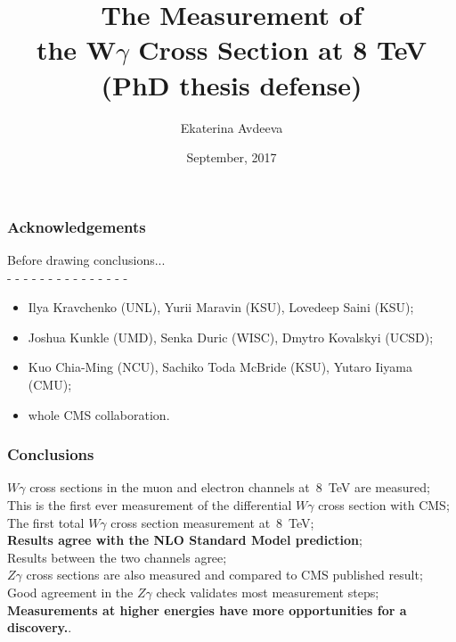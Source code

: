 \documentclass{beamer}
\title{The Measurement of \\ the W$\gamma$ Cross Section at 8 TeV \\ (PhD thesis defense) }
\author{Ekaterina Avdeeva}
\institute{University of Nebraska - Lincoln}
\date{September, 2017}
\begin{document}
\begin{frame}
\titlepage %
\end{frame}


\begin{frame}\frametitle{Acknowledgements}
  \scriptsize
  Before drawing conclusions...\\
  - - - - - - - - - - - - - - - \\
  \begin{itemize}
     \item Ilya Kravchenko (UNL), Yurii Maravin (KSU), Lovedeep Saini (KSU);
     \item Joshua Kunkle (UMD), Senka Duric (WISC), Dmytro Kovalskyi (UCSD);
     \item Kuo Chia-Ming (NCU), Sachiko Toda McBride (KSU), Yutaro Iiyama (CMU);
     \item whole CMS collaboration.
  \end{itemize}
\end{frame}%
 

\begin{frame}\frametitle{Conclusions} %
  \scriptsize
     \vspace{5mm}
     $W\gamma$ cross sections in the muon and electron channels at~8~TeV are measured; \\
     \vspace{5mm}
     This is the first ever measurement of the differential $W\gamma$ cross section with CMS;\\
     The first total $W\gamma$ cross section measurement at~8~TeV;\\
     \vspace{5mm}    
     {\bfseries{Results agree with the NLO Standard Model prediction}};\\
     Results between the two channels agree;\\
     \vspace{5mm}
     $Z\gamma$ cross sections are also measured and compared to CMS published result;\\
     Good agreement in the $Z\gamma$ check validates most measurement steps;\\
     \vspace{5mm}
     {\bfseries{Measurements at higher energies have more opportunities for a discovery.}}.\\
     \vspace{5mm}
\end{frame}%



%
\end{document}
